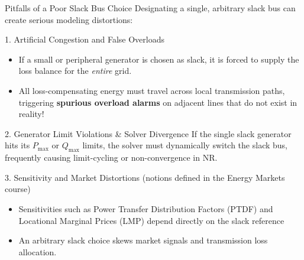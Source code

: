 \begin{frame}[allowframebreaks]{Pitfalls of a Poor Slack Bus Choice}
    Designating a single, arbitrary slack bus can create serious modeling distortions:
    
    \begin{block}{1. Artificial Congestion and False Overloads}
        \begin{itemize}
            \item If a small or peripheral generator is chosen as slack, it is forced to supply the loss balance for the \textit{entire} grid.
            \item All loss-compensating energy must travel across local transmission paths, triggering \textbf{spurious overload alarms} on adjacent lines that do not exist in reality!
        \end{itemize}
    \end{block}
    \begin{block}{2. Generator Limit Violations \& Solver Divergence}
        If the single slack generator hits its $P_{\max}$ or $Q_{\max}$ limits, the solver must dynamically switch the slack bus, frequently causing limit-cycling or non-convergence in NR.
    \end{block}

    \newpage
    \begin{block}{3. Sensitivity and Market Distortions (notions defined in the Energy Markets course)}
        \begin{itemize}
            \item Sensitivities such as Power Transfer Distribution Factors (PTDF) and Locational Marginal Prices (LMP) depend directly on the slack reference 
            \item An arbitrary slack choice skews market signals and transmission loss allocation.
        \end{itemize}
    \end{block}
    
    
\end{frame}

